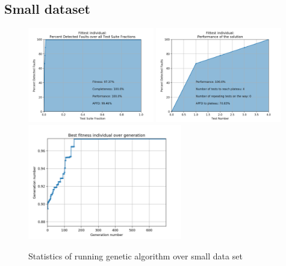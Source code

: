 \documentclass[12pt]{article}
\begin{document}
\subsection{Small dataset}

\begin{figure}[H]
  \centering
  \includegraphics[width=0.49\textwidth]{ga_small_apfd_total}
  \includegraphics[width=0.49\textwidth]{ga_small_apfd_local}
  \includegraphics[width=0.6\textwidth]{ga_small_fitness_all}
  \caption{Statistics of running genetic algorithm over small data set}
  \label{fig:ga_small}
\end{figure}
\end{document}
